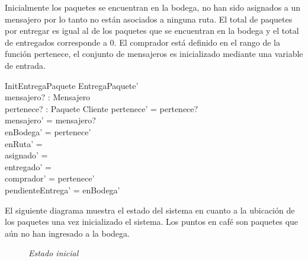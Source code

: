 \documentclass[12pt,a4paper,table]{article}
\begin{document}
Inicialmente los paquetes se encuentran en la bodega, no han sido asignados a un mensajero por lo tanto no están asociados a ninguna ruta. El total de paquetes por entregar es igual al de los paquetes que se encuentran en la bodega y el total de entregados corresponde a 0. El comprador está definido en el rango de la función pertenece, el conjunto de mensajeros es inicializado mediante una variable de entrada.

\begin{schema}{InitEntregaPaquete}
EntregaPaquete'\\
mensajero? : \power Mensajero\\
pertenece? : Paquete \pfun Cliente
\where
pertenece' = pertenece?\\
mensajero' = mensajero?\\
enBodega' = \dom pertenece'\\
enRuta' = \emptyset\\
asignado' = \emptyset\\
entregado' = \emptyset\\
comprador' = \ran pertenece'\\
pendienteEntrega' = enBodega'
\end{schema}

El siguiente diagrama muestra el estado del sistema en cuanto a la ubicación de los paquetes una vez inicializado el sistema. Los puntos en café son paquetes que aún no han ingresado a la bodega.

\begin{figure}[H]
\centering
{}
\caption{\textit{Estado inicial}} \label{fig:M1}
\end{figure}
\end{document}
